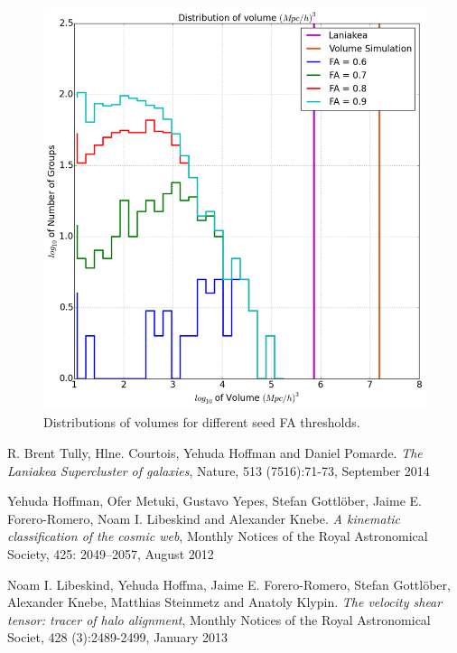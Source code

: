 \documentclass[preprint,proceedings]{rmaa}
\begin{document}
\begin{figure}[!t]
  \includegraphics[width=\columnwidth]{Volumenes}
  \caption{Distributions of volumes for different seed FA thresholds.
}
  \label{fig:simple}
\end{figure}


\begin{thebibliography}

 R. Brent Tully, Hlne. Courtois, Yehuda Hoffman and Daniel Pomarde. 
{\em The Laniakea Supercluster of galaxies}, Nature, 513 (7516):71-73, September 2014 
 
 Yehuda Hoffman, Ofer Metuki, Gustavo Yepes, Stefan Gottlöber, Jaime E. Forero-Romero, Noam I. Libeskind and Alexander Knebe. 
{\em A kinematic classification of the cosmic web}, Monthly Notices of the Royal Astronomical Society, 425: 2049–2057, August 2012

 Noam I. Libeskind, Yehuda Hoffma, Jaime E. Forero-Romero, Stefan Gottlöber, Alexander Knebe, Matthias Steinmetz and Anatoly Klypin. 
{\em The velocity shear tensor: tracer of halo alignment}, Monthly Notices of the Royal Astronomical Societ, 428 (3):2489-2499, January 2013
  
\end{thebibliography}
\end{document}
